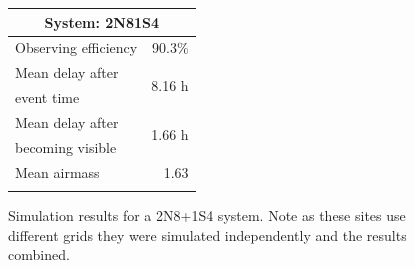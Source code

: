 \begin{colsection}
\begin{colsection}
\begin{figure}[p]
\begin{center}
\begin{minipage}[t]{0.35\textwidth}
\begin{tabular}{lr}
\multicolumn{2}{c}{\textbf{System: 2N8\+1S4}} \\
\midrule
Observing efficiency & 90.3\% \\
\midrule
Mean delay after     & \multirow{2}{*}{8.16 h} \\
event time           & \\
Mean delay after     & \multirow{2}{*}{1.66 h} \\
becoming visible     & \\
\midrule
Mean airmass         & 1.63 \\
& \\
\end{tabular}
\vfill
\end{minipage}

\end{center}
\caption[Simulation results: 2N8+1S4 system]{Simulation results for a 2N8+1S4 system. Note as these sites use different grids they were simulated independently and the results combined.
}
\label{fig:sim_2n8+1s4}
\end{figure}


\begin{figure}[p]
\begin{center}


\end{center}
\end{figure}
\end{colsection}
\end{colsection}
